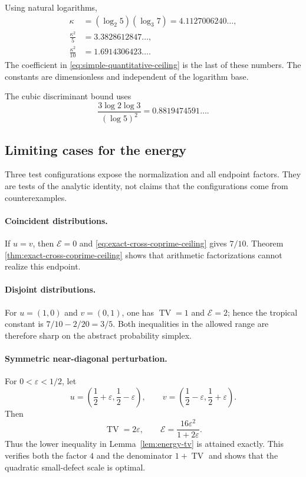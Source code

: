 \documentclass[11pt,oneside]{article}
\theoremstyle{research}
\theoremstyle{definition}
\newcommand{\E}{\mathcal E}
\newcommand{\TV}{\operatorname{TV}}
\begin{document}
Using natural logarithms,
\begin{align}
 \kappa
 &=(\log_2 5)(\log_3 7)
   =4.1127006240\ldots,\\
 \frac{\kappa^2}{5}
 &=3.3828612847\ldots,\\
 \frac{\kappa^2}{10}
 &=1.6914306423\ldots .
 \label{eq:numerical-kappa-data}
\end{align}
The coefficient in \eqref{eq:simple-quantitative-ceiling} is the last of these
numbers.  The constants are dimensionless and independent of the logarithm
base.

The cubic discriminant bound uses
\begin{equation}
 \frac{3\log2\log3}{(\log5)^2}
 =0.8819474591\ldots .
 \label{eq:numerical-delta-constant}
\end{equation}

\subsection{Limiting cases for the energy}

Three test configurations expose the normalization and all endpoint factors.
They are tests of the analytic identity, not claims that the configurations
come from counterexamples.

\paragraph{Coincident distributions.}
If $u=v$, then $\E=0$ and
\eqref{eq:exact-cross-coprime-ceiling} gives $7/10$.  Theorem
\ref{thm:exact-cross-coprime-ceiling} shows that arithmetic factorizations
cannot realize this endpoint.

\paragraph{Disjoint distributions.}
For $u=(1,0)$ and $v=(0,1)$, one has $\TV=1$ and $\E=2$; hence the tropical
constant is $7/10-2/20=3/5$.  Both inequalities in the allowed range are
therefore sharp on the abstract probability simplex.

\paragraph{Symmetric near-diagonal perturbation.}
For $0<\varepsilon<1/2$, let
\[
 u=\left(\frac12+\varepsilon,\frac12-\varepsilon\right),
 \qquad
 v=\left(\frac12-\varepsilon,\frac12+\varepsilon\right).
\]
Then
\begin{equation}
 \TV=2\varepsilon,
 \qquad
 \E=\frac{16\varepsilon^2}{1+2\varepsilon}.
 \label{eq:near-diagonal-test}
\end{equation}
Thus the lower inequality in Lemma~\ref{lem:energy-tv} is attained exactly.
This verifies both the factor $4$ and the denominator $1+\TV$ and shows that
the quadratic small-defect scale is optimal.
\end{document}
